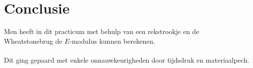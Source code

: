 \section{Conclusie}

Men heeft in dit practicum met behulp van een rekstrookje
en de Wheatstonebrug de $E$-modulus kunnen berekenen.
\\ \\
Dit ging gepaard met enkele onnauwkeurigheden door tijdsdruk en
materiaalpech.